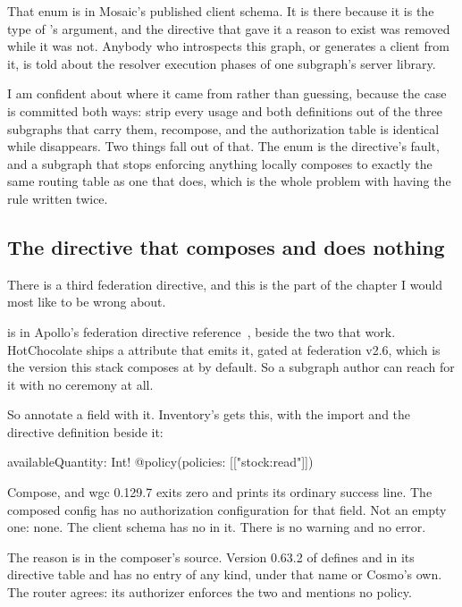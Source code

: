 %
That enum is in Mosaic's published client schema. It is there because it is the
type of 's  argument, and the directive that gave
it a reason to exist was removed while it was not. Anybody who introspects this
graph, or generates a client from it, is told about the resolver execution
phases of one subgraph's server library.

I am confident about where it came from rather than guessing, because the case
is committed both ways: strip every  usage and both definitions
out of the three subgraphs that carry them, recompose, and the authorization
table is identical while  disappears. Two things fall out of
that. The enum is the directive's fault, and a subgraph that stops enforcing
anything locally composes to exactly the same routing table as one that does,
which is the whole problem with having the rule written twice.

\subsection*{The directive that composes and does nothing}

%
There is a third federation directive, and this is the part of the chapter I
would most like to be wrong about.

 is in Apollo's federation directive
reference~\autocite{apollo2026authdirectives}, beside the two that work.
HotChocolate ships a \code{[Policy]} attribute that emits it, gated at
federation v2.6, which is the version this stack composes at by default. So a
subgraph author can reach for it with no ceremony at all.

So annotate a field with it. Inventory's  gets this,
with the  import and the directive definition beside it:

\begin{graphqlsdl}[fontsize=\footnotesize]
availableQuantity: Int! @policy(policies: [["stock:read"]])
\end{graphqlsdl}

Compose, and wgc 0.129.7 exits zero and prints its ordinary success line. The
composed config has no authorization configuration for that field. Not an empty
one: none. The client schema has no  in it. There is no warning
and no error.

The reason is in the composer's source. Version 0.63.2 of
 defines  and
 in its directive table and has no  entry of
any kind, under that name or Cosmo's own. The router agrees: its authorizer
enforces the two and mentions no policy.

